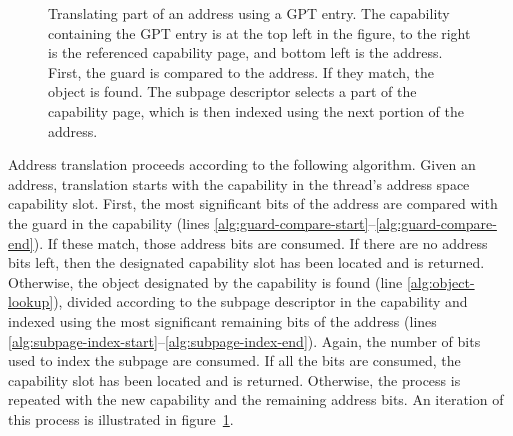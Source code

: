\begin{figure}
\begin{center}
  \end{center}
  \caption[Address translation using guard page tables]{Translating
    part of an address using a GPT entry.  The capability containing
    the GPT entry is at the top left in the figure, to the right is
    the referenced capability page, and bottom left is the address.
    First, the guard is compared to the address.  If they match, the
    object is found.  The subpage descriptor selects a part of the
    capability page, which is then indexed using the next portion of
    the address.}
  \label{fig:address-translation}
\end{figure}


Address translation proceeds according to the following algorithm.
Given an address, translation starts with the capability in the
thread's address space capability slot.  First, the most significant
bits of the address are compared with the guard in the capability
(lines \ref{alg:guard-compare-start}--\ref{alg:guard-compare-end}).
If these match, those address bits are consumed.  If there are no
address bits left, then the designated capability slot has been
located and is returned.  Otherwise, the object designated by the
capability is found (line \ref{alg:object-lookup}), divided according
to the subpage descriptor in the capability and indexed using the most
significant remaining bits of the address (lines
\ref{alg:subpage-index-start}--\ref{alg:subpage-index-end}).  Again,
the number of bits used to index the subpage are consumed.  If all the
bits are consumed, the capability slot has been located and is
returned.  Otherwise, the process is repeated with the new capability
and the remaining address bits.  An iteration of this process is
illustrated in figure~\ref{fig:address-translation}.

